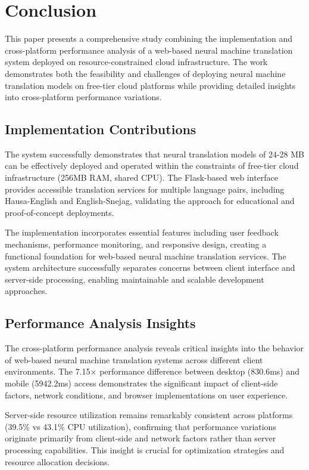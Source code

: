 \documentclass[conference]{IEEEtran}
\begin{document}
\section{Conclusion}

This paper presents a comprehensive study combining the implementation and cross-platform performance analysis of a web-based neural machine translation system deployed on resource-constrained cloud infrastructure. The work demonstrates both the feasibility and challenges of deploying neural machine translation models on free-tier cloud platforms while providing detailed insights into cross-platform performance variations.

\subsection{Implementation Contributions}

The system successfully demonstrates that neural translation models of 24-28 MB can be effectively deployed and operated within the constraints of free-tier cloud infrastructure (256MB RAM, shared CPU). The Flask-based web interface provides accessible translation services for multiple language pairs, including Hausa-English and English-Snejag, validating the approach for educational and proof-of-concept deployments.

The implementation incorporates essential features including user feedback mechanisms, performance monitoring, and responsive design, creating a functional foundation for web-based neural machine translation services. The system architecture successfully separates concerns between client interface and server-side processing, enabling maintainable and scalable development approaches.

\subsection{Performance Analysis Insights}

The cross-platform performance analysis reveals critical insights into the behavior of web-based neural machine translation systems across different client environments. The 7.15× performance difference between desktop (830.6ms) and mobile (5942.2ms) access demonstrates the significant impact of client-side factors, network conditions, and browser implementations on user experience.

Server-side resource utilization remains remarkably consistent across platforms (39.5\% vs 43.1\% CPU utilization), confirming that performance variations originate primarily from client-side and network factors rather than server processing capabilities. This insight is crucial for optimization strategies and resource allocation decisions.
\end{document}
